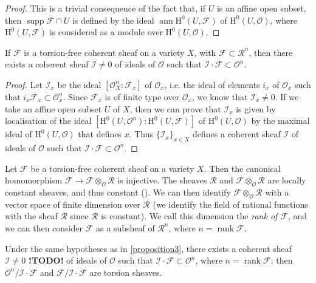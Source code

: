 \documentclass{article}
\theoremstyle{plain}
\newenvironment{proposition}[1]
    {\renewcommand\theinnercustomproposition{#1}\innercustomproposition}
    {\endinnercustomproposition}
\theoremstyle{definition}
\newcommand{\sh}{\mathscr}
\newcommand{\HH}{\mathrm{H}}
\DeclareMathOperator{\ann}{ann}
\DeclareMathOperator{\supp}{supp}
\DeclareMathOperator{\rank}{rank}
\newcommand{\todo}{\textbf{ !TODO! }}
\begin{document}
\begin{proof}
  This is a trivial consequence of the fact that, if $U$ is an affine open subset, then $\supp\sh{F}\cap U$ is defined by the ideal $\ann\HH^0(U,\sh{F})$ of $\HH^0(U,\sh{O})$, where $\HH^0(U,\sh{F})$ is considered as a module over $\HH^0(U,\sh{O})$.
\end{proof}

\begin{proposition}{3}
\label{proposition3}
  If $\sh{F}$ is a torsion-free coherent sheaf on a variety $X$, with $\sh{F}\subset\sh{R}^n$, then there exists a coherent sheaf $\sh{I}\neq0$ of ideals of $\sh{O}$ such that $\sh{I}\cdot\sh{F}\subset\sh{O}^n$.
\end{proposition}

\begin{proof}
  Let $\sh{I}_x$ be the ideal $[\sh{O}_X^n:\sh{F}_x]$ of $\sh{O}_x$, i.e. the ideal of elements $i_x$ of $\sh{O}_x$ such that $i_x\sh{F}_x\subset\sh{O}_x^n$.
  Since $\sh{F}_x$ is of finite type over $\sh{O}_x$, we know that $\sh{I}_x\neq0$.
  If we take an affine open subset $U$ of $X$, then we can prove that $\sh{I}_x$ is given by localisation of the ideal $[\HH^0(U,\sh{O}^n):\HH^0(U,\sh{F})]$ of $\HH^0(U,\sh{O})$ by the maximal ideal of $\HH^0(U,\sh{O})$ that defines $x$.
  Thus $\{\sh{I}_x\}_{x\in X}$ defines a coherent sheaf $\sh{I}$ of ideals of $\sh{O}$ such that $\sh{I}\cdot\sh{F}\subset\sh{O}^n$.
\end{proof}

Let $\sh{F}$ be a torsion-free coherent sheaf on a variety $X$.
Then the canonical homomorphism $\sh{F}\to\sh{F}\otimes_{\sh{O}}\sh{R}$ is injective.
The sheaves $\sh{R}$ and $\sh{F}\otimes_{\sh{O}}\sh{R}$ are locally constant sheaves, and thus constant (\cite[page~229]{5}).
We can then identify $\sh{F}\otimes_{\sh{O}}\sh{R}$ with a vector space of finite dimension over $\sh{R}$ (we identify the field of rational functions with the sheaf $\sh{R}$ since $\sh{R}$ is constant).
We call this dimension the \emph{rank of $\sh{F}$}, and we can then consider $\sh{F}$ as a subsheaf of $\sh{R}^n$, where $n=\rank\sh{F}$.

\begin{proposition}{4}
\label{proposition4}
  Under the same hypotheses as in \cref{proposition3}, there exists a coherent sheaf $\sh{I}\neq0$\todo of ideals of $\sh{O}$ such that $\sh{I}\cdot\sh{F}\subset\sh{O}^n$, where $n=\rank\sh{F}$;
  then $\sh{O}^n/\sh{I}\cdot\sh{F}$ and $\sh{F}/\sh{I}\cdot\sh{F}$ are torsion sheaves.
\end{proposition}
\end{document}
